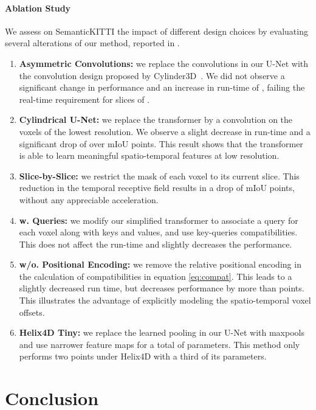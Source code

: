 \documentclass[runningheads]{tpls/llncs}
\begin{document}
\paragraph{Ablation Study}
We assess on SemanticKITTI the impact of different design choices by evaluating several alterations of our method, reported in .
\begin{enumerate}[label=\bf(\alph*), topsep=0cm, wide, labelwidth=!, labelindent=0pt]
    \item {\bf Asymmetric Convolutions:}\label{abla:asymconv} we replace the  convolutions in our U-Net with the convolution design proposed by Cylinder3D~\cite{zhu2021cylindrical}. We did not observe a significant change in performance and an increase in run-time of , failing the real-time requirement for slices of .
\item {\bf Cylindrical U-Net:}\label{abla:cunet} we replace the transformer by a  convolution on the voxels of the lowest resolution. We observe a slight decrease in run-time and a significant drop of over  mIoU points. This result shows that the transformer is able to learn meaningful spatio-temporal features at low resolution.
    \item {\bf Slice-by-Slice:}\label{abla:sbs} we restrict the mask  of each voxel to its current slice. This reduction in the temporal receptive field results in a drop of  mIoU points, without any appreciable acceleration.
    \item {\bf w. Queries:}\label{abla:wqueries} we modify our simplified transformer to associate a query for each voxel along with keys and values, and use key-queries compatibilities. This does not affect the run-time and slightly decreases the performance.
    \item {\bf w/o. Positional Encoding:}\label{abla:wope} {we remove the relative positional encoding  in the calculation of compatibilities in equation \eqref{eq:compat}.} This leads to a slightly decreased run time, but decreases performance by more than  points. This illustrates the advantage of explicitly modeling the spatio-temporal voxel offsets.\item {\bf Helix4D Tiny:}\label{abla:tiny} we replace the learned pooling in our U-Net with maxpools and use narrower feature maps for a total of  parameters. This method only performs two points under Helix4D with a third of its parameters.
\end{enumerate} \section{Conclusion}\label{sec:conclusion}
\end{document}
